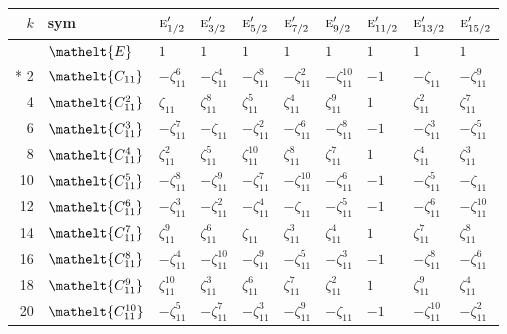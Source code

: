 \documentclass[10pt,a4paper]{article}
\numberwithin{equation}{section}
\newcommand{\eltfont}[1]{{\let\sigma\eltsigma\mathelt{#1}}}
\newcommand{\irr}[1]{\text{\normalfont\scshape #1}}
\newcommand{\cls}[1]{\eltfont{#1}}
\newcommand{\rootunity}[1]{\zeta_{#1}}
\begin{document}
{\small\setlength{\tabcolsep}{4pt}
\begin{longtable}{@{}rlllllllll@{}}\toprule
$k$ & sym & $\irr{e}_{1/2}'$ & $\irr{e}_{3/2}'$ & $\irr{e}_{5/2}'$ & $\irr{e}_{7/2}'$ & $\irr{e}_{9/2}'$ & $\irr{e}_{11/2}'$ & $\irr{e}_{13/2}'$ & $\irr{e}_{15/2}'$\\\midrule\endhead
\bottomrule\endfoot\endlastfoot
0 & $\cls{E}$ & $1$ & $1$ & $1$ & $1$ & $1$ & $1$ & $1$ & $1$\\*
2 & $\cls{C_{11}}$ & $-\rootunity{11}^{6}$ & $-\rootunity{11}^{4}$ & $-\rootunity{11}^{8}$ & $-\rootunity{11}^{2}$ & $-\rootunity{11}^{10}$ & $-1$ & $-\rootunity{11}$ & $-\rootunity{11}^{9}$\\
4 & $\cls{C_{11}^{2}}$ & $\rootunity{11}$ & $\rootunity{11}^{8}$ & $\rootunity{11}^{5}$ & $\rootunity{11}^{4}$ & $\rootunity{11}^{9}$ & $1$ & $\rootunity{11}^{2}$ & $\rootunity{11}^{7}$\\
6 & $\cls{C_{11}^{3}}$ & $-\rootunity{11}^{7}$ & $-\rootunity{11}$ & $-\rootunity{11}^{2}$ & $-\rootunity{11}^{6}$ & $-\rootunity{11}^{8}$ & $-1$ & $-\rootunity{11}^{3}$ & $-\rootunity{11}^{5}$\\
8 & $\cls{C_{11}^{4}}$ & $\rootunity{11}^{2}$ & $\rootunity{11}^{5}$ & $\rootunity{11}^{10}$ & $\rootunity{11}^{8}$ & $\rootunity{11}^{7}$ & $1$ & $\rootunity{11}^{4}$ & $\rootunity{11}^{3}$\\
10 & $\cls{C_{11}^{5}}$ & $-\rootunity{11}^{8}$ & $-\rootunity{11}^{9}$ & $-\rootunity{11}^{7}$ & $-\rootunity{11}^{10}$ & $-\rootunity{11}^{6}$ & $-1$ & $-\rootunity{11}^{5}$ & $-\rootunity{11}$\\
12 & $\cls{C_{11}^{6}}$ & $-\rootunity{11}^{3}$ & $-\rootunity{11}^{2}$ & $-\rootunity{11}^{4}$ & $-\rootunity{11}$ & $-\rootunity{11}^{5}$ & $-1$ & $-\rootunity{11}^{6}$ & $-\rootunity{11}^{10}$\\
14 & $\cls{C_{11}^{7}}$ & $\rootunity{11}^{9}$ & $\rootunity{11}^{6}$ & $\rootunity{11}$ & $\rootunity{11}^{3}$ & $\rootunity{11}^{4}$ & $1$ & $\rootunity{11}^{7}$ & $\rootunity{11}^{8}$\\
16 & $\cls{C_{11}^{8}}$ & $-\rootunity{11}^{4}$ & $-\rootunity{11}^{10}$ & $-\rootunity{11}^{9}$ & $-\rootunity{11}^{5}$ & $-\rootunity{11}^{3}$ & $-1$ & $-\rootunity{11}^{8}$ & $-\rootunity{11}^{6}$\\
18 & $\cls{C_{11}^{9}}$ & $\rootunity{11}^{10}$ & $\rootunity{11}^{3}$ & $\rootunity{11}^{6}$ & $\rootunity{11}^{7}$ & $\rootunity{11}^{2}$ & $1$ & $\rootunity{11}^{9}$ & $\rootunity{11}^{4}$\\
20 & $\cls{C_{11}^{10}}$ & $-\rootunity{11}^{5}$ & $-\rootunity{11}^{7}$ & $-\rootunity{11}^{3}$ & $-\rootunity{11}^{9}$ & $-\rootunity{11}$ & $-1$ & $-\rootunity{11}^{10}$ & $-\rootunity{11}^{2}$\\

\end{longtable}}
\end{document}

